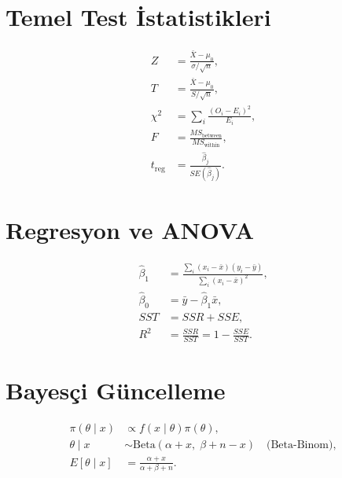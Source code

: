 \section{Temel Test İstatistikleri}
\begin{align*}
Z &= \frac{\bar{X}-\mu_0}{\sigma/\sqrt{n}}, \\
T &= \frac{\bar{X}-\mu_0}{S/\sqrt{n}}, \\
\chi^2 &= \sum_i \frac{(O_i-E_i)^2}{E_i}, \\
F &= \frac{MS_{\text{between}}}{MS_{\text{within}}}, \\
t_{\text{reg}} &= \frac{\hat{\beta}_j}{SE(\hat{\beta}_j)}.
\end{align*}

\section{Regresyon ve ANOVA}
\begin{align*}
\hat{\beta}_1 &= \frac{\sum_i (x_i-\bar{x})(y_i-\bar{y})}{\sum_i (x_i-\bar{x})^2}, \\
\hat{\beta}_0 &= \bar{y}-\hat{\beta}_1\bar{x}, \\
SST &= SSR + SSE, \\
R^2 &= \frac{SSR}{SST}=1-\frac{SSE}{SST}.
\end{align*}

\section{Bayesçi Güncelleme}
\begin{align*}
\pi(\theta\mid x) &\propto f(x\mid\theta)\pi(\theta), \\
\theta\mid x &\sim \text{Beta}(\alpha+x,\; \beta+n-x) \quad \text{(Beta-Binom)}, \\
E[\theta\mid x] &= \frac{\alpha+x}{\alpha+\beta+n}.
\end{align*}